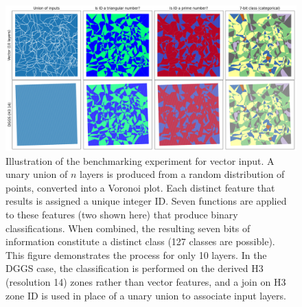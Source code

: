 \documentclass[]{interact}
\theoremstyle{plain}%
\theoremstyle{definition}
\theoremstyle{remark}
\begin{document}
\begin{figure}[t]
    \centering
    \includegraphics[width=\linewidth]{images/vector_benchmark_10_input_example.png}
    \caption{Illustration of the benchmarking experiment for vector input. A unary union of $n$ layers is produced from a random distribution of points, converted into a Voronoi plot. Each distinct feature that results is assigned a unique integer ID. Seven functions are applied to these features (two shown here) that produce binary classifications. When combined, the resulting seven bits of information constitute a distinct class (127 classes are possible). This figure demonstrates the process for only 10 layers. In the \ac{DGGS} case, the classification is performed on the derived H3 (resolution 14) zones rather than vector features, and a join on H3 zone ID is used in place of a unary union to associate input layers.}
    \label{fig:BenchmarkVectIllustration}
\end{figure}
\end{document}
